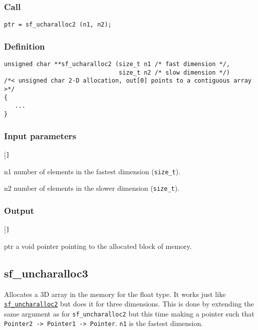 \subsubsection*{Call}
\begin{verbatim}ptr = sf_ucharalloc2 (n1, n2);\end{verbatim}

\subsubsection*{Definition}
\begin{verbatim}
unsigned char **sf_ucharalloc2 (size_t n1 /* fast dimension */, 
                                size_t n2 /* slow dimension */)
/*< unsigned char 2-D allocation, out[0] points to a contiguous array >*/
{
   ...
}
\end{verbatim}

\subsubsection*{Input parameters}
\begin{desclist}{\tt }{\quad}[\tt ]
   \setlength\itemsep{0pt}
   \item[n1] number of elements in the fastest dimension (\texttt{size\_t}).
   \item[n2] number of elements in the slower dimension (\texttt{size\_t}).
\end{desclist}

\subsubsection*{Output}
\begin{desclist}{\tt }{\quad}[\tt ]
   \setlength\itemsep{0pt}
   \item[ptr] a void pointer pointing to the allocated block of memory.
\end{desclist}





\subsection{{sf\_uncharalloc3}}
Allocates a 3D array in the memory for the float type. It works just like \hyperref[sec:sf_uncharalloc2]{\texttt{sf\_uncharalloc2}} but does it for three dimensions. This is done by extending the same argument as for \texttt{sf\_uncharalloc2} but this time making a pointer such that \texttt{Pointer2 -> Pointer1 -> Pointer}. \texttt{n1} is the fastest dimension.


